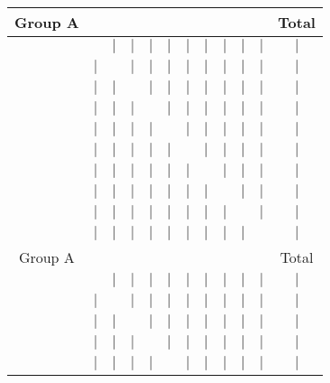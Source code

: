 \documentclass[landscape]{article}
\begin{document}
\centering
\begin{tabular}{|c|c|c|c|c|c|c|c|c|c|c|c|}
    \hline
    \rowcolor{red} Group A & & & & & & & & & & & Total \\
    \hline
    & \cellcolor{black} & $|$ & $|$ & $|$ & $|$ & $|$ & $|$ & $|$ & $|$ & $|$ & \cellcolor{red} $|$ \\
    \hline
    & $|$ & \cellcolor{black} & $|$ & $|$ & $|$ & $|$ & $|$ & $|$ & $|$ & $|$ & \cellcolor{red} $|$ \\
    \hline
    & $|$ & $|$ & \cellcolor{black} & $|$ & $|$ & $|$ & $|$ & $|$ & $|$ & $|$ & \cellcolor{red} $|$ \\
    \hline
    & $|$ & $|$ & $|$ & \cellcolor{black} & $|$ & $|$ & $|$ & $|$ & $|$ & $|$ & \cellcolor{red} $|$ \\
    \hline
    & $|$ & $|$ & $|$ & $|$ & \cellcolor{black} & $|$ & $|$ & $|$ & $|$ & $|$ & \cellcolor{red} $|$ \\
    \hline
    & $|$ & $|$ & $|$ & $|$ & $|$ & \cellcolor{black} & $|$ & $|$ & $|$ & $|$ & \cellcolor{red} $|$ \\
    \hline
    & $|$ & $|$ & $|$ & $|$ & $|$ & $|$ & \cellcolor{black} & $|$ & $|$ & $|$ & \cellcolor{red} $|$ \\
    \hline
    & $|$ & $|$ & $|$ & $|$ & $|$ & $|$ & $|$ & \cellcolor{black} & $|$ & $|$ & \cellcolor{red} $|$ \\
    \hline
    & $|$ & $|$ & $|$ & $|$ & $|$ & $|$ & $|$ & $|$ & \cellcolor{black} & $|$ & \cellcolor{red} $|$ \\
    \hline
    & $|$ & $|$ & $|$ & $|$ & $|$ & $|$ & $|$ & $|$ & $|$ & \cellcolor{black} & \cellcolor{red} $|$ \\
    \hline\hline
    \rowcolor{blue} Group A & & & & & & & & & & & Total \\
    \hline
    & \cellcolor{black} & $|$ & $|$ & $|$ & $|$ & $|$ & $|$ & $|$ & $|$ & $|$ & \cellcolor{blue} $|$ \\
    \hline
    & $|$ & \cellcolor{black} & $|$ & $|$ & $|$ & $|$ & $|$ & $|$ & $|$ & $|$ & \cellcolor{blue} $|$ \\
    \hline
    & $|$ & $|$ & \cellcolor{black} & $|$ & $|$ & $|$ & $|$ & $|$ & $|$ & $|$ & \cellcolor{blue} $|$ \\
    \hline
    & $|$ & $|$ & $|$ & \cellcolor{black} & $|$ & $|$ & $|$ & $|$ & $|$ & $|$ & \cellcolor{blue} $|$ \\
    \hline
    & $|$ & $|$ & $|$ & $|$ & \cellcolor{black} & $|$ & $|$ & $|$ & $|$ & $|$ & \cellcolor{blue} $|$ \\

\end{tabular}
\end{document}
